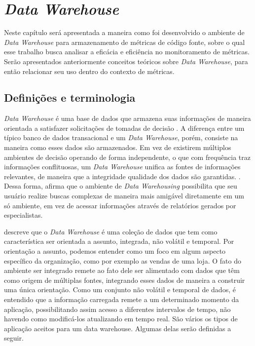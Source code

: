 \chapter{\textit{Data Warehouse}} 
\label{chap:arquitetura}

Neste capítulo será apresentada a maneira como foi desenvolvido o ambiente de \textit{Data Warehouse} para armazenamento de métricas de código fonte, sobre o qual esse trabalho busca analisar a eficácia e eficiência no monitoramento de métricas. Serão apresentados anteriormente conceitos teóricos sobre \textit{Data Warehouse}, para então relacionar seu uso dentro do contexto de métricas. 

\section{Definições e terminologia}

\textit{Data Warehouse} é uma base de dados que armazena suas informações de maneira orientada a satisfazer solicitações de tomadas de decisão \cite{chaudhuri1997}. A diferença entre um típico banco de dados transacional e um  \textit{Data Warehouse}, porém, consiste na maneira como esses dados são armazenados. Em vez de existirem múltiplos ambientes de decisão operando de forma independente, o que com frequência traz informações conflituosas, um \textit{Data Warehouse} unifica as fontes de informações relevantes, de maneira que a integridade  qualidade dos dados são garantidas. \cite{neeraj_sharma_2011}. Dessa forma, afirma que o ambiente de \textit{Data Warehousing} possibilita que seu usuário realize buscas complexas de maneira mais amigável diretamente em um só ambiente, em vez de acessar informações através de relatórios gerados por especialistas. 

 descreve que o \textit{Data Warehouse} é uma coleção de dados que tem como característica ser orientada a assunto, integrada, não volátil e temporal. Por orientação a assunto, podemos entender como um foco em algum aspecto específico da organização, como por exemplo as vendas de uma loja. O fato do ambiente ser integrado remete ao fato dele ser alimentado com dados que têm como origem de múltiplas fontes, integrando esses dados de maneira a construir uma única orientação. Como um conjunto não volátil e temporal de dados, é entendido que a informação carregada remete a um determinado momento da aplicação, possibilitando assim acesso a diferentes intervalos de tempo, não havendo como modificá-los atualizando em tempo real. São vários os tipos de aplicação aceitos para um data warehouse. Algumas delas serão definidas a seguir.


